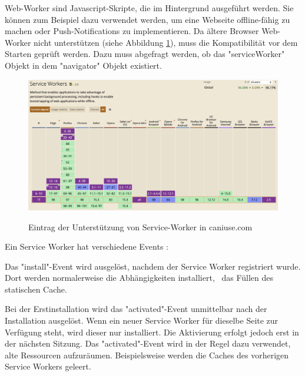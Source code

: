 

Web-Worker sind Javascript-Skripte, die im Hintergrund ausgeführt werden. 
Sie können zum Beispiel dazu verwendet werden, um eine Webseite offline-fähig zu machen oder Push-Notifications zu implementieren.
Da ältere Browser Web-Worker nicht unterstützen (siehe Abbildung \ref{fig:CanIUseServiceWorker}), muss die Kompatibilität vor dem Starten geprüft werden. 
Dazu muss abgefragt werden, ob das "serviceWorker" Objekt in dem "navigator" Objekt existiert. 

\begin{figure}[H]
    \centering
    \includegraphics[width=\textwidth]{media/ServiceWorker/CanIUseServiceWorker.png}
    \caption{Eintrag der Unterstützung von Service-Worker in caniuse.com}
    \cite{ciuServiceWorker}
    \label{fig:CanIUseServiceWorker}
\end{figure}

\clearpage


Ein Service Worker hat verschiedene Events \cite{MDNCacheAPI}: 


Das "install"-Event wird ausgelöst, nachdem der Service Worker registriert wurde. Dort werden normalerweise die Abhängigkeiten installiert, \zb\ das Füllen des statischen Cache.
    

Bei der Erstinstallation wird das "activated"-Event unmittelbar nach der Installation ausgelöst.
Wenn ein neuer Service Worker für dieselbe Seite zur Verfügung steht, wird dieser nur installiert.
Die Aktivierung erfolgt jedoch erst in der nächsten Sitzung.
Das "activated"-Event wird in der Regel dazu verwendet, alte Ressourcen aufzuräumen. 
Beispielsweise werden die Caches des vorherigen Service Workers geleert.

